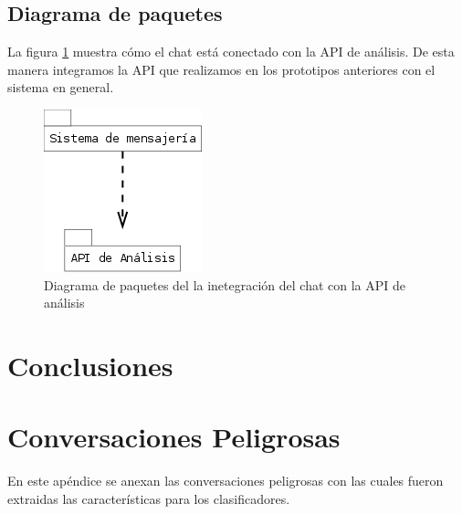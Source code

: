 \documentclass[oneside,10pt]{book}
\begin{document}
\section{Diagrama de paquetes}
La figura \ref{fig:paquetes} muestra c\'omo el chat est\'a conectado con la API de an\'alisis. De esta manera integramos la API que realizamos en los prototipos anteriores con el sistema en general.
\begin{figure}
\begin{center}
\includegraphics[scale=.8]{images/Diagramas/paquetes}
\caption{Diagrama de paquetes del la inetegraci\'on del chat con la API de an\'alisis}
\label{fig:paquetes}
\end{center}
\end{figure}





\chapter{Conclusiones}





\appendix
\chapter{Conversaciones Peligrosas}\label{app:conversaciones}
En este ap\'endice se anexan las conversaciones peligrosas con las cuales fueron extraidas las caracter\'isticas para los clasificadores.

















%






















\end{document}
